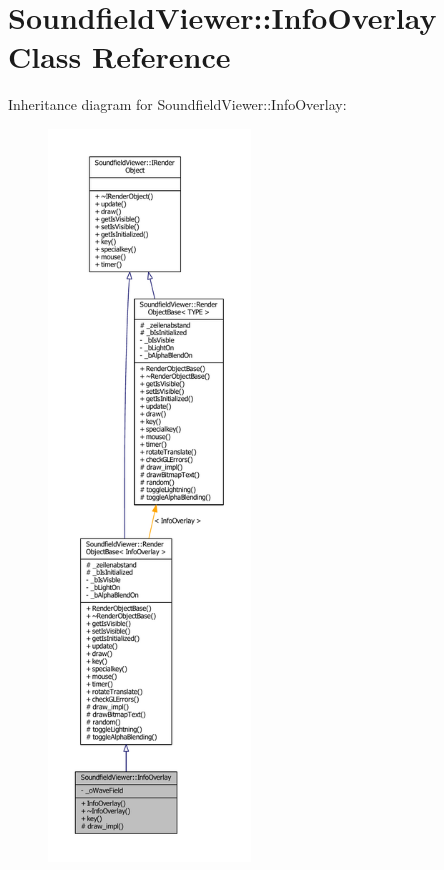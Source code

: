 \section{Soundfield\-Viewer\-:\-:Info\-Overlay Class Reference}
\label{classSoundfieldViewer_1_1InfoOverlay}


Inheritance diagram for Soundfield\-Viewer\-:\-:Info\-Overlay\-:\nopagebreak
\begin{figure}[H]
\begin{center}
\leavevmode
\includegraphics[height=550pt]{dd/d97/classSoundfieldViewer_1_1InfoOverlay__inherit__graph}
\end{center}
\end{figure}



